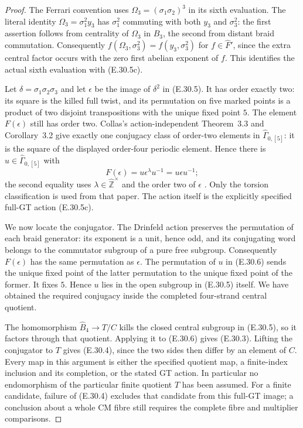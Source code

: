 \begin{proof}
The Ferrari convention uses $\Omega_3=(\sigma_1\sigma_2)^3$
in its sixth evaluation.  The literal identity
$\Omega_3=\sigma_1^2y_3$ has $\sigma_1^2$ commuting with
both $y_3$ and $\sigma_3^2$: the first assertion follows
from centrality of $\Omega_3$ in $B_3$, the second from
distant braid commutation.  Consequently
$f(\Omega_3,\sigma_3^2)=f(y_3,\sigma_3^2)$ for
$f\in\widehat F'$, since the extra central factor occurs
with the zero first abelian exponent of $f$.
This identifies the actual sixth evaluation with
\textup{(E.30.5c)}.

Let $\delta=\sigma_1\sigma_2\sigma_3$ and let $\epsilon$ be
the image of $\delta^2$ in \textup{(E.30.5)}.  It has order
exactly two: its square is the killed full twist, and its
permutation on five marked points is a product of two disjoint
transpositions with the unique fixed point $5$.
The element $F(\epsilon)$ still has order two.
Collas's action-independent Theorem~3.3 and Corollary~3.2
give exactly one conjugacy class of order-two elements in
$\widehat\Gamma_{0,[5]}$: it is the square of the displayed
order-four periodic element.  Hence there is
$u\in\widehat\Gamma_{0,[5]}$ with
\[
                         F(\epsilon)=u\epsilon^\lambda u^{-1}
                                      =u\epsilon u^{-1};
 \tag{E.30.6}
\]
the second equality uses $\lambda\in\widehat{\mathbb Z}^{\times}$
and the order two of $\epsilon$
\cite{ERootCollas2012}.
Only the torsion classification is used from that paper.
The action itself is the explicitly specified full-GT
action \textup{(E.30.5c)}.

We now locate the conjugator.  The Drinfeld action preserves
the permutation of each braid generator: its exponent is a
unit, hence odd, and its conjugating word belongs to the
commutator subgroup of a pure free subgroup.  Consequently
$F(\epsilon)$ has the same permutation as $\epsilon$.
The permutation of $u$ in \textup{(E.30.6)} sends the unique
fixed point of the latter permutation to the unique fixed
point of the former.  It fixes $5$.  Hence $u$ lies in the
open subgroup in \textup{(E.30.5)} itself.  We have obtained
the required conjugacy inside the completed four-strand
central quotient.

The homomorphism $\widehat B_4\to T/C$ kills the closed
central subgroup in \textup{(E.30.5)}, so it factors through
that quotient.  Applying it to \textup{(E.30.6)} gives
\textup{(E.30.3)}.  Lifting the conjugator to $T$ gives
\textup{(E.30.4)}, since the two sides then differ by an
element of $C$.  Every map in this argument is either the
specified quotient map, a finite-index inclusion and its
completion, or the stated GT action.  In particular no
endomorphism of the particular finite quotient $T$ has been
assumed.  For a finite candidate, failure of
\textup{(E.30.4)} excludes that candidate from this full-GT
image; a conclusion about a whole CM fibre still requires
the complete fibre and multiplier comparisons.
\end{proof}

